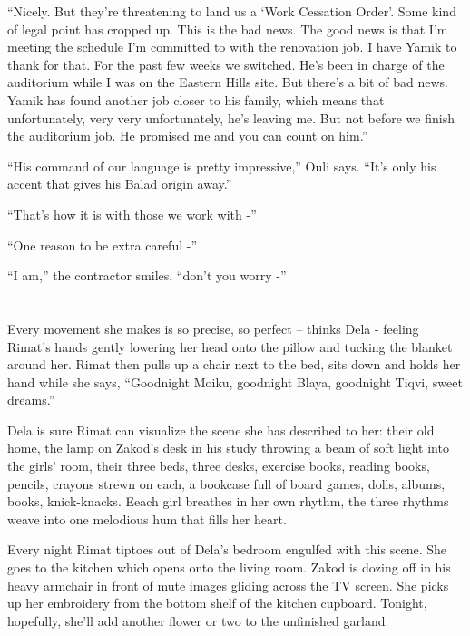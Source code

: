 \documentclass[twoside,11pt]{book}
\begin{document}
``Nicely. But they're threatening to land us a `Work Cessation Order'. Some kind of legal point has cropped
up. This is the bad news. The good news is that I'm meeting the schedule I'm committed to with the renovation job. I
have Yamik to thank for that. For the past few weeks we switched. He's been in charge of the auditorium while I was on
the Eastern Hills site. But there's a bit of bad news. Yamik has found another job closer to his family, which means
that unfortunately, very very unfortunately, he's leaving me. But not before we finish the auditorium job. He promised
me and you can count on him.''

``His command of our language is pretty impressive,'' Ouli says. ``It's only his
accent that gives his Balad origin away.''

``That's how it is with those we work with -''

``One reason to be extra careful -''

``I am,'' the contractor smiles, ``don't you worry -''



\chapter{}

Every movement she makes is so precise, so perfect -- thinks Dela - feeling Rimat's hands gently lowering her head onto
the pillow and tucking the blanket around her. Rimat then pulls up a chair next to the bed, sits down and holds her
 hand while she says, ``Goodnight Moiku,  goodnight Blaya, goodnight Tiqvi, sweet dreams.''

Dela is sure Rimat can visualize the scene she has described to her: their old home, the lamp on Zakod's desk in his
study throwing a beam of soft light into the girls' room, their three beds, three desks, exercise books, reading
books, pencils, crayons strewn on each, a bookcase full of board games, dolls, albums, books, knick-knacks. Eeach girl
breathes in her own rhythm, the three rhythms weave into one melodious hum that fills her heart.

Every night Rimat tiptoes out of Dela's bedroom engulfed with this scene. She goes to the kitchen which opens onto the
living room. Zakod is dozing off in his heavy armchair in front of mute images gliding across the TV screen. She
picks up her embroidery from the bottom shelf of the kitchen cupboard. Tonight, hopefully, she'll add another flower or
two to the unfinished garland.
\end{document}

